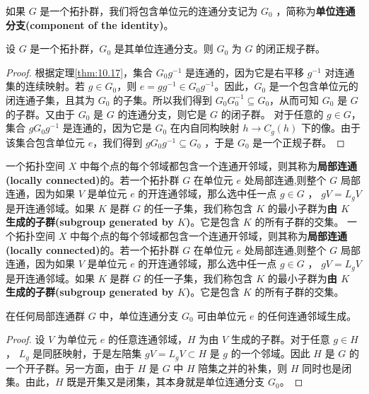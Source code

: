 如果 $G$ 是一个拓扑群，我们将包含单位元的连通分支记为 $ G_{0}$ ，简称为\textbf{单位连通分支(component of the identity)}。

\begin{theorem}\label{eg:10.20}
	设 $G$ 是一个拓扑群，$G_{0}$ 是其单位连通分支。则 $G_{0}$ 为 $G$ 的闭正规子群。
\end{theorem}

\begin{proof}
	根据定理\ref{thm:10.17}，集合 $G_{0} g^{-1}$ 是连通的，因为它是右平移 $g^{-1}$ 对连通集的连续映射。若 $g\in G_{0}$，则 $e=gg^{-1} \in G_{0} g^{-1}$。因此，$G_{0}$ 是一个包含单位元的闭连通子集，且其为 $G_{0}$ 的子集。所以我们得到 $G_{0} G_{0}^{-1} \subseteq G_{0}$，从而可知 $G_{0}$ 是 $G$ 的子群。又由于 $G_{0}$ 是 $G$ 的连通分支，则它是 $G$ 的闭子群。
	对于任意的 $g\in G$，集合 $gG_{0} g^{-1}$ 是连通的，因为它是 $G_{0}$ 在内自同构映射 $h\rightarrow C_{g} (h)$ 下的像。由于该集合包含单位元 $e$，我们得到 $gG_{0} g^{-1} \subseteq G_{0}$ ，于是 $G_{0}$ 是一个正规子群。
\end{proof}

一个拓扑空间 $X$ 中每个点的每个邻域都包含一个连通开邻域，则其称为\textbf{局部连通(locally connected)}的。若一个拓扑群 $G$ 在单位元 $e$ 处局部连通,则整个 $G$ 局部连通，因为如果 $V$ 是单位元 $e$ 的开连通邻域，那么选中任一点 $g\in G$ ， $gV =L_{g} V$ 是开连通邻域。如果 $K$ 是群 $G$ 的任一子集，我们称包含 $K$ 的最小子群为\textbf{由 $K$ 生成的子群(subgroup generated by $ K$)}。它是包含 $K$ 的所有子群的交集。
一个拓扑空间 $X$ 中每个点的每个邻域都包含一个连通开邻域，则其称为\textbf{局部连通(locally connected)}的。若一个拓扑群 $G$ 在单位元 $e$ 处局部连通,则整个 $G$ 局部连通，因为如果 $V$ 是单位元 $e$ 的开连通邻域，那么选中任一点 $g\in G$ ， $gV =L_{g} V$ 是开连通邻域。如果 $K$ 是群 $G$ 的任一子集，我们称包含 $K$ 的最小子群为\textbf{由 $K$ 生成的子群(subgroup generated by $ K$)}。它是包含 $K$ 的所有子群的交集。

\begin{theorem}\label{eg:10.21}
	在任何局部连通群 $G$ 中，单位连通分支 $G_{0}$ 可由单位元 $e$ 的任何连通邻域生成。
\end{theorem}

\begin{proof}
	设 $V$ 为单位元 $e$ 的任意连通邻域，$H$ 为由 $V$ 生成的子群。对于任意 $g\in H$， $L_{g}$ 是同胚映射，于是左陪集 $gV=L_{g} V\subset H$ 是 $g$ 的一个邻域。因此 $H$ 是 $G$ 的一个开子群。另一方面，由于 $H$ 是 $G$ 中 $H$ 陪集之并的补集，则 $H$ 同时也是闭集。由此，$H$ 既是开集又是闭集，其本身就是单位连通分支 $G_{0}$。
\end{proof}

